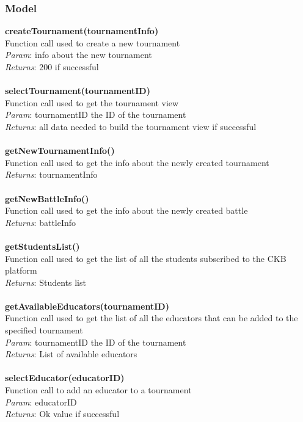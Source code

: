 \documentclass{article}
\begin{document}
\subsubsection{Model}
\textbf{createTournament(tournamentInfo)}\\
Function call used to create a new tournament\\
\textit{Param}: info about the new tournament\\
\textit{Returns}: 200 if successful\\
\\
\textbf{selectTournament(tournamentID)}\\
Function call used to get the  tournament view\\
\textit{Param}: tournamentID the ID of the tournament\\
\textit{Returns}: all data needed to build the tournament view if successful\\
\\
\textbf{getNewTournamentInfo()}\\
Function call used to get the info about the newly created tournament\\
\textit{Returns}: tournamentInfo\\
\\
\textbf{getNewBattleInfo()}\\
Function call used to get the info about the newly created battle\\
\textit{Returns}: battleInfo\\
\\
\textbf{getStudentsList()}\\
Function call used to get the list of all the students subscribed to the CKB platform\\
\textit{Returns}: Students list\\
\\
\textbf{getAvailableEducators(tournamentID)}\\
Function call used to get the list of all the educators that can be added to the specified tournament\\
\textit{Param}: tournamentID the ID of the tournament\\
\textit{Returns}: List of available educators\\
\\
\textbf{selectEducator(educatorID)}\\
Function call to add an educator to a tournament\\
\textit{Param}: educatorID\\
\textit{Returns}: Ok value if successful\\
\end{document}
